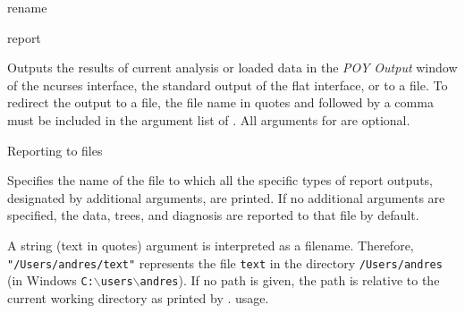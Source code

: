\begin{command}{rename}{}
\begin{arguments}
          \end{arguments}
          
          \begin{poyexamples}
    \end{poyexamples}

\end{command}
        
\begin{command}{report}{}


	\begin{poydescription} 
        Outputs the results of current analysis or loaded data in the \emph{POY Output}
        window of the ncurses interface, the standard output of the flat
        interface, or to a file. To redirect the output to a file, the file name in 
        quotes and followed by a comma must be included in the argument list
        of . All arguments for  are
        optional. 
	\end{poydescription}

	\begin{arguments}

        \begin{argumentgroup}{Reporting to files}{}

                {Specifies the name of the file to which all the specific types of report outputs,
                designated by additional arguments, are printed. If no additional arguments
                are specified, the data, trees, and diagnosis are reported to that file by
                default.
                
                A string (text in quotes) argument is interpreted as a filename.
                Therefore, \texttt{"/Users/andres/text"} represents the file \texttt{text} in
                the directory \texttt{/Users/andres} (in Windows
                \texttt{C:$\backslash$users$\backslash$andres}). If no path is given, the path
                is relative to the current working directory as printed by
                .
                usage.} 
                {}
        \end{argumentgroup}
                

\end{arguments}
\end{command}
